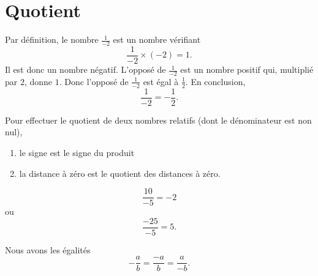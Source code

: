 \section{Quotient}

Par définition, le nombre \( \frac{1}{ -2 }\) est un nombre vérifiant
\begin{equation}
    \frac{1}{ -2 }\times(-2)=1.
\end{equation}
Il est donc un nombre négatif. L'opposé de \( \frac{1}{ -2 }\) est un nombre positif qui, multiplié par \( 2\), donne \( 1\). Donc l'opposé de \( \frac{1}{ -2 }\) est égal à \( \frac{1}{ 2 }\). En conclusion,
\begin{equation}
    \frac{1}{ -2 }=-\frac{1}{ 2 }.
\end{equation}

\begin{Aretenir}
    Pour effectuer le quotient de deux nombres relatifs (dont le dénominateur est non nul),
    \begin{enumerate}
        \item
            le signe est le signe du produit
        \item
            la distance à zéro est le quotient des distances à zéro.
    \end{enumerate}
\end{Aretenir}

\begin{example}
    \begin{equation}
        \frac{ 10 }{ -5 }=-2
    \end{equation}
    ou
    \begin{equation}
        \frac{ -25 }{ -5 }=5.
    \end{equation}
\end{example}

\begin{remark}
    Nous avons les égalités
    \begin{equation}
        -\frac{ a }{ b }=\frac{ -a }{ b }=\frac{ a }{ -b }.
    \end{equation}
\end{remark}

